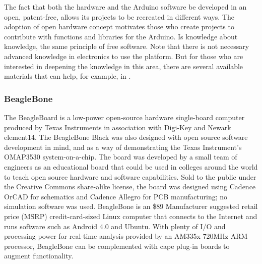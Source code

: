 \documentclass{acm_proc_article-sp}
\begin{document}
The fact that both the hardware and the Arduino software be developed in an open, patent-free, allows its projects to be recreated in different ways. The adoption of open hardware concept motivates those who create projects to contribute with functions and libraries for the Arduino. Is knowledge about knowledge, the same principle of free software.
\newline
\newline
Note that there is not necessary advanced knowledge in electronics to use the platform. But for those who are interested in deepening the knowledge in this area, there are several available materials that can help, for example, in \cite{Eletronica}.

\subsubsection{BeagleBone}
The BeagleBoard is a low-power open-source hardware single-board computer produced by Texas Instruments in association with Digi-Key and Newark element14. The BeagleBone Black was also designed with open source software development in mind, and as a way of demonstrating the Texas Instrument's OMAP3530 system-on-a-chip\cite{coley2009take}. The board was developed by a small team of engineers as an educational board that could be used in colleges around the world to teach open source hardware and software capabilities. Sold to the public under the Creative Commons share-alike license, the board was designed using Cadence OrCAD for schematics and Cadence Allegro for PCB manufacturing; no simulation software was used.
\newline
\newline
BeagleBone is an \$89 Manufacturer suggested retail price (MSRP) credit-card-sized Linux computer that connects to the Internet and runs software such as Android 4.0 and Ubuntu. With plenty of I/O and processing power for real-time analysis provided by an AM335x 720MHz ARM\textregistered\, processor, BeagleBone can be complemented with cape plug-in boards to augment functionality.
\end{document}
